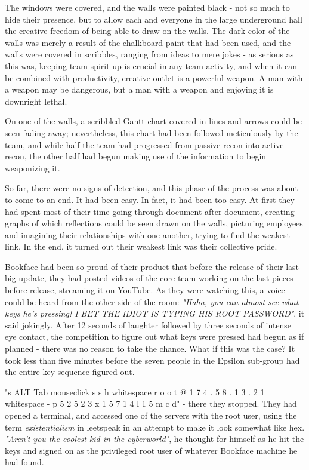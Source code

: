 The windows were covered, and the walls were painted black - not so much to hide their presence, but to allow each and everyone in the large underground hall the creative freedom of being able to draw on the walls. The dark color of the walls was merely a result of the chalkboard paint that had been used, and the walls were covered in scribbles, ranging from ideas to mere jokes - as serious as this was, keeping team spirit up is crucial in any team activity, and when it can be combined with productivity, creative outlet is a powerful weapon. A man with a weapon may be dangerous, but a man with a weapon and enjoying it is downright lethal. 

On one of the walls, a scribbled Gantt-chart covered in lines and arrows could be seen fading away; nevertheless, this chart had been followed meticulously by the team, and while half the team had progressed from passive recon into active recon, the other half had begun making use of the information to begin weaponizing it. 

So far, there were no signs of detection, and this phase of the process was about to come to an end. It had been easy. In fact, it had been too easy. At first they had spent most of their time going through document after document, creating graphs of which reflections could be seen drawn on the walls, picturing employees and imagining their relationships with one another, trying to find the weakest link. In the end, it turned out their weakest link was their collective pride. 

Bookface had been so proud of their product that before the release of their last big update, they had posted videos of the core team working on the last pieces before release, streaming it on YouTube. As they were watching this, a voice could be heard from the other side of the room: \textit{"Haha, you can almost see what keys he's pressing! I BET THE IDIOT IS TYPING HIS ROOT PASSWORD"}, it said jokingly. After 12 seconds of laughter followed by three seconds of intense eye contact, the competition to figure out what keys were pressed had begun as if planned - there was no reason to take the chance. What if this was the case? It took less than five minutes before the seven people in the Epsilon sub-group had the entire key-sequence figured out.

"s ALT Tab mouseclick s s h whitespace r o o t @ 1 7 4 . 5 8 . 1 3 . 2 1 whitespace - p 5 2 5 2 3 x 1 5 7 1 4 l 1 5 m c d" - there they stopped. They had opened a terminal, and accessed one of the servers with the root user, using the term \textit{existentialism} in leetspeak in an attempt to make it look somewhat like hex. \textit{"Aren't you the coolest kid in the cyberworld"}, he thought for himself as he hit the keys and signed on as the privileged root user of whatever Bookface machine he had found.   

